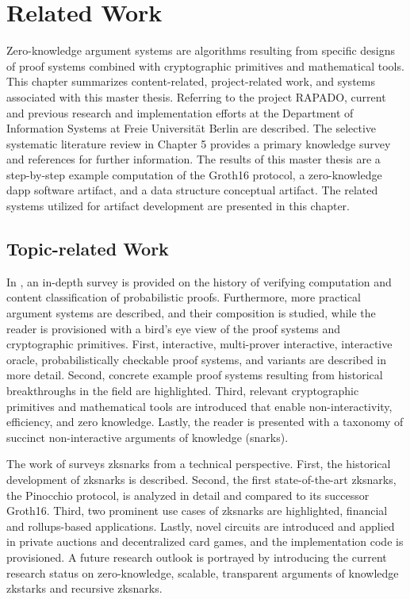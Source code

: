 \chapter{Related Work}
Zero-knowledge argument systems are algorithms resulting from specific designs of proof systems combined with cryptographic primitives and mathematical tools. This chapter summarizes content-related, project-related work, and systems associated with this master thesis. Referring to the project RAPADO, current and previous research and implementation efforts at the Department of Information Systems at Freie Universit{\"a}t Berlin are described. The selective systematic literature review in Chapter 5 provides a primary knowledge survey and references for further information. The results of this master thesis are a step-by-step example computation of the Groth16 protocol, a zero-knowledge \acrshort{dapp} software artifact, and a data structure conceptual artifact. The related systems utilized for artifact development are presented in this chapter.

\section{Topic-related Work}
In \citet{Thaler}, an in-depth survey is provided on the history of verifying computation and content classification of probabilistic proofs. Furthermore, more practical argument systems are described, and their composition is studied, while the reader is provisioned with a bird's eye view of the proof systems and cryptographic primitives. First, interactive, multi-prover interactive, interactive oracle, probabilistically checkable proof systems, and variants are described in more detail. Second, concrete example proof systems resulting from historical breakthroughs in the field are highlighted. Third, relevant cryptographic primitives and mathematical tools are introduced that enable non-interactivity, efficiency, and zero knowledge. Lastly, the reader is presented with a taxonomy of succinct non-interactive arguments of knowledge (\acrshort{snark}s).

The work of \citet{chen2022review} surveys \acrshort{zksnark}s from a technical perspective. First, the historical development of \acrshort{zksnark}s is described. Second, the first state-of-the-art \acrshort{zksnark}s, the Pinocchio protocol, is analyzed in detail and compared to its successor Groth16. Third, two prominent use cases of \acrshort{zksnark}s are highlighted, financial and rollups-based applications. Lastly, novel circuits are introduced and applied in private auctions and decentralized card games, and the implementation code is provisioned. A future research outlook is portrayed by introducing the current research status on zero-knowledge, scalable, transparent arguments of knowledge \acrshort{zkstark}s and recursive \acrshort{zksnark}s.


